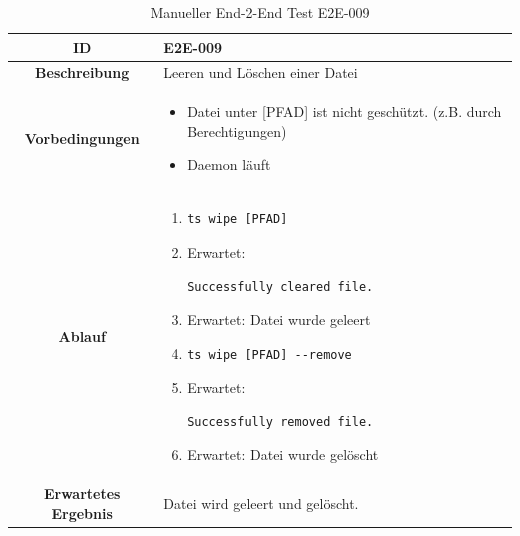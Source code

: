 \documentclass[a4paper,12pt]{report}
\begin{document}
    \begin{table}[h!]
        \centering
        \setlength{\leftmargini}{0.8cm}
        \begin{tabular}{|c|p{10cm}|}
            \hline
            \textbf{ID}                  & E2E-009                          \\ \hline
            \textbf{Beschreibung}        & Leeren und Löschen einer Datei   \\ \hline
            \textbf{Vorbedingungen} &
            \begin{itemize}
                \item Datei unter [PFAD] ist nicht geschützt. (z.B. durch Berechtigungen)
                \item Daemon läuft
            \end{itemize} \\ \hline
            \textbf{Ablauf} &
            \begin{enumerate}
                \item \begin{verbatim}ts wipe [PFAD]
                \end{verbatim}
                \item Erwartet: \begin{verbatim}Successfully cleared file.
                \end{verbatim}
                \item Erwartet: Datei wurde geleert
                \item \begin{verbatim}ts wipe [PFAD] --remove
                \end{verbatim}
                \item Erwartet: \begin{verbatim}Successfully removed file.
                \end{verbatim}
                \item Erwartet: Datei wurde gelöscht
            \end{enumerate} \\ \hline
            \textbf{Erwartetes Ergebnis} & Datei wird geleert und gelöscht. \\ \hline
        \end{tabular}
        \caption{Manueller End-2-End Test E2E-009}\label{tab:e2e-9}
    \end{table}
\end{document}

